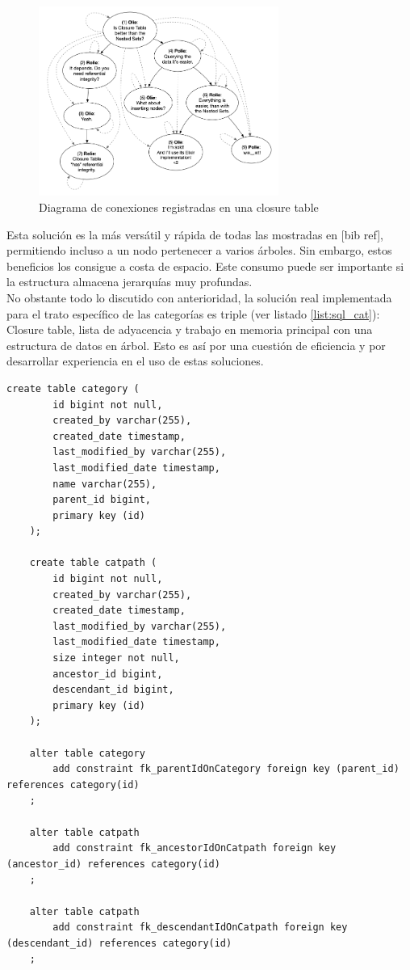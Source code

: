 \documentclass[a4paper]{article}
\begin{document}
    \begin{figure}[htb!]
    	\centering
    	\includegraphics[width=0.7\textwidth]{closure_table}
    	\caption{Diagrama de conexiones registradas en una closure table}
    	\label{fig:closure_table}
    \end{figure}
    
    Esta solución es la más versátil y rápida de todas las mostradas en [bib ref], permitiendo incluso a un nodo pertenecer a varios árboles. Sin embargo, estos beneficios los consigue a costa de espacio. Este consumo puede ser importante si la estructura almacena jerarquías muy profundas.
    \\
    
    No obstante todo lo discutido con anterioridad, la solución real implementada para el trato específico de las categorías es triple (ver listado \ref{list:sql_cat}): Closure table, lista de adyacencia y trabajo en memoria principal con una estructura de datos en árbol. Esto es así por una cuestión de eficiencia y por desarrollar experiencia en el uso de estas soluciones.
    \\
    
    \begin{lstlisting}[caption=Tablas que gestionan las categorías,label=list:sql_cat]
    create table category (
    	id bigint not null, 
    	created_by varchar(255), 
    	created_date timestamp, 
    	last_modified_by varchar(255), 
    	last_modified_date timestamp, 
    	name varchar(255), 
    	parent_id bigint, 
    	primary key (id)
    );
    	
    create table catpath (
    	id bigint not null, 
    	created_by varchar(255), 
    	created_date timestamp, 
    	last_modified_by varchar(255), 
    	last_modified_date timestamp, 
    	size integer not null, 
    	ancestor_id bigint, 
    	descendant_id bigint, 
    	primary key (id)
    );
    
    alter table category 
    	add constraint fk_parentIdOnCategory foreign key (parent_id) references category(id)
    ;
    
    alter table catpath 
    	add constraint fk_ancestorIdOnCatpath foreign key (ancestor_id) references category(id)
    ;
    
    alter table catpath 
    	add constraint fk_descendantIdOnCatpath foreign key (descendant_id) references category(id)
    ;
    \end{lstlisting}
    
\end{document}
